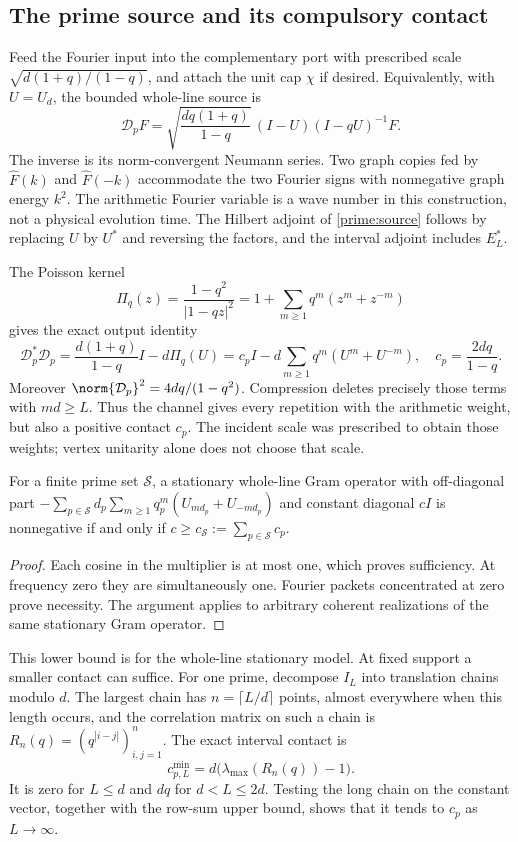 \subsection{The prime source and its compulsory contact}
Feed the Fourier input into the complementary port with prescribed
scale $\sqrt{d(1+q)/(1-q)}$, and attach the unit cap $\chi$ if
desired. Equivalently, with $U=U_d$, the bounded whole-line source is
\begin{equation}\label{prime:source}
\mathcal D_pF=
\sqrt{\frac{dq(1+q)}{1-q}}\,
 (I-U)(I-qU)^{-1}F.
\end{equation}
The inverse is its norm-convergent Neumann series. Two graph copies
fed by $\widehat F(k)$ and $\widehat F(-k)$ accommodate the two
Fourier signs with nonnegative graph energy $k^2$. The arithmetic
Fourier variable is a wave number in this construction, not a
physical evolution time. The Hilbert adjoint of
\eqref{prime:source} follows by replacing $U$ by $U^*$ and reversing
the factors, and the interval adjoint includes $E_L^*$.

The Poisson kernel
\[
\Pi_q(z)=\frac{1-q^2}{|1-qz|^2}
        =1+\sum_{m\ge1}q^m(z^m+z^{-m})
\]
gives the exact output identity
\begin{equation}\label{prime:gram}
\mathcal D_p^*\mathcal D_p
=\frac{d(1+q)}{1-q}I-d\Pi_q(U)
=c_pI-d\sum_{m\ge1}q^m(U^m+U^{-m}),
\quad c_p=\frac{2dq}{1-q}.
\end{equation}
Moreover $\norm{\mathcal D_p}^2=4dq/(1-q^2)$.
Compression deletes precisely those terms with $md\ge L$.
Thus the channel gives every repetition with the arithmetic weight,
but also a positive contact $c_p$. The incident scale was prescribed
to obtain those weights; vertex unitarity alone does not choose
that scale.

\begin{proposition}\label{prime:contact}
For a finite prime set $\mathcal S$, a stationary whole-line Gram
operator with off-diagonal part
$-\sum_{p\in\mathcal S}d_p\sum_{m\ge1}q_p^m(U_{md_p}+U_{-md_p})$
and constant diagonal $cI$ is nonnegative if and only if
$c\ge c_{\mathcal S}:=\sum_{p\in\mathcal S}c_p$.
\end{proposition}
\begin{proof}
Each cosine in the multiplier is at most one, which proves
sufficiency. At frequency zero they are simultaneously one.
Fourier packets concentrated at zero prove necessity. The argument
applies to arbitrary coherent realizations of the same stationary
Gram operator.
\end{proof}
This lower bound is for the whole-line stationary model. At fixed
support a smaller contact can suffice. For one prime, decompose
$I_L$ into translation chains modulo $d$. The largest chain has
$n=\lceil L/d\rceil$ points, almost everywhere when this length
occurs, and the correlation matrix on such a chain is
$R_n(q)=(q^{|i-j|})_{i,j=1}^n$. The exact interval contact is
\begin{equation}\label{prime:finite-contact}
c_{p,L}^{\min}=d\bigl(\lambda_{\max}(R_n(q))-1\bigr).
\end{equation}
It is zero for $L\le d$ and $dq$ for $d<L\le2d$.
Testing the long chain on the constant vector, together with the
row-sum upper bound, shows that it tends to $c_p$ as $L\to\infty$.


